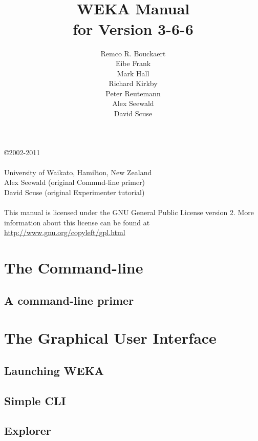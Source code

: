 \documentclass[a4paper]{book}
\title{\epsfig{file=images/coat_of_arms.eps,width=10cm}\vspace{3cm}\\WEKA Manual\\for Version 3-6-6}
\author{Remco R. Bouckaert\\Eibe Frank\\Mark Hall\\Richard Kirkby\\Peter Reutemann\\Alex Seewald\\David Scuse}
\begin{document}
\begin{titlepage}
\maketitle
\thispagestyle{empty}
\center
\begin{table}[b]
\copyright 2002-2011 \\
 \\
University of Waikato, Hamilton, New Zealand \\
Alex Seewald (original Commnd-line primer) \\
David Scuse (original Experimenter tutorial) \\
\\
This manual is licensed under the GNU General Public License version 2. More information about this license can be found at \url{http://www.gnu.org/copyleft/gpl.html}
\end{table}

\end{titlepage}

\tableofcontents

\part{The Command-line}

\chapter{A command-line primer}


\part{The Graphical User Interface}

\chapter{Launching WEKA}


\chapter{Simple CLI}


\chapter{Explorer}

\end{document}
